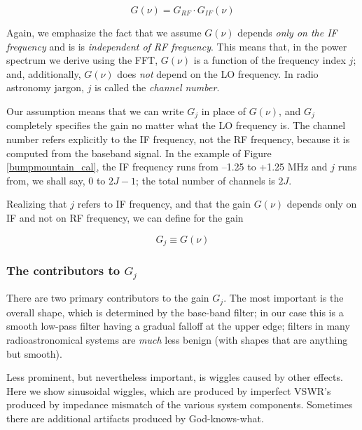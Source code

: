 \begin{equation}
G(\nu) = G_{RF} \cdot G_{IF}(\nu)
\end{equation}	

	Again, we emphasize the fact that we assume $G(\nu)$ depends
{\it only on the IF frequency} and is is {\it independent of RF
frequency}. This means that, in the power spectrum we derive using the
FFT, $G(\nu)$ is a function of the frequency index $j$; and,
additionally, $G(\nu)$ does {\it not} depend on the LO frequency. In
radio astronomy jargon, $j$ is called the {\it channel number}. 

	Our assumption means that we can write $G_j$ in place of
$G(\nu)$, and $G_j$ completely specifies the gain no matter what the LO
frequency is. The channel number refers explicitly to the IF frequency,
not the RF frequency, because it is computed from the baseband signal.
In the example of Figure \ref{bumpmountain_cal}, the IF frequency runs
from --1.25 to +1.25 MHz and $j$ runs from, we shall say, 0 to $2J-1$;
the total number of channels is $2J$. 

	Realizing that $j$ refers to IF frequency, and that the gain
$G(\nu)$ depends only on IF and not on RF frequency, we can define for
the gain

\begin{equation}
G_j \equiv G(\nu)
\end{equation}

\subsubsection{The contributors to $G_j$ }

	There are two primary contributors to the gain $G_j$.  The most
important is the overall shape, which is determined by the base-band
filter; in our case this is a smooth low-pass filter having a gradual
falloff at the upper edge; filters in many radioastronomical systems are
{\it much} less benign (with shapes that are anything but smooth).

	Less prominent, but nevertheless important, is wiggles caused by
other effects. Here we show sinusoidal wiggles, which  are produced by
imperfect VSWR's produced by impedance mismatch of the various system
components. Sometimes there are additional artifacts produced by
God-knows-what.


